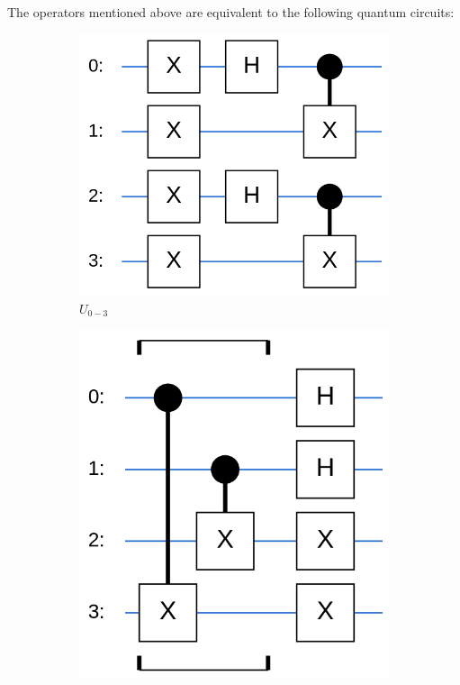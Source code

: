 \documentclass[a4paper,11pt,aps,tightenlines,nofootinbib]{revtex4}
\begin{document}
        The operators mentioned above are equivalent to the following quantum circuits:
        \begin{figure}[h!]
                \begin{subfigure}[b]{.3\textwidth}
                \includegraphics[scale=.3]{images/qtet_state_prep.png}
                \caption{$U_{0-3}$}
                \end{subfigure}
                \begin{subfigure}[b]{.3\textwidth}
                \includegraphics[scale=.3]{images/inv_bell_state.png}

\end{subfigure}
\end{figure}
\end{document}
